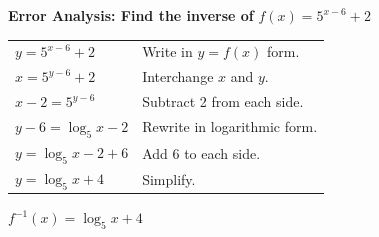 \documentclass[border=6pt]{standalone}
\begin{document}
\begin{minipage}{10cm}
\centering
\textbf{Error Analysis: Find the inverse of }$f(x)=5^{x-6}+2$\par\vspace{8pt}
\begin{tabular}{@{} >{\centering\arraybackslash}p{4.5cm} >{\raggedright\arraybackslash}p{4.5cm} @{}}
\toprule
$y=5^{x-6}+2$ & Write in $y=f(x)$ form. \\
$x=5^{y-6}+2$ & Interchange $x$ and $y$. \\
$x-2=5^{y-6}$ & Subtract 2 from each side. \\
$y-6=\log_5 x-2$ & Rewrite in logarithmic form. \\
$y=\log_5 x-2+6$ & Add 6 to each side. \\
$y=\log_5 x+4$ & Simplify. \\
\bottomrule
\end{tabular}
\par\vspace{8pt}
$f^{-1}(x)=\log_5 x+4$
\end{minipage}
\end{document}
